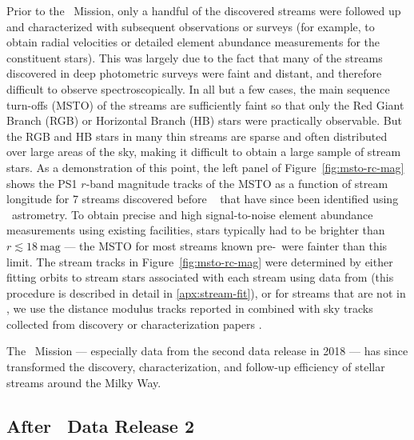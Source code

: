 \documentclass[final,5p,times,twocolumn,authoryear]{elsarticle}
\begin{document}
Prior to the \gaia\ Mission, only a handful of the discovered streams were followed up
and characterized with subsequent observations or surveys (for example, to obtain radial
velocities or detailed element abundance measurements for the constituent stars).
This was largely due to the fact that many of the streams discovered in deep photometric
surveys were faint and distant, and therefore difficult to observe spectroscopically.
In all but a few cases, the main sequence turn-offs (MSTO) of the streams are
sufficiently faint so that only the Red Giant Branch (RGB) or Horizontal Branch (HB)
stars were practically observable.
But the RGB and HB stars in many thin streams are sparse and often distributed over
large areas of the sky, making it difficult to obtain a large sample of stream stars.
As a demonstration of this point, the left panel of Figure~\ref{fig:msto-rc-mag} shows
the PS1 $r$-band magnitude tracks of the MSTO as a function of stream longitude for 7
streams discovered before \gaia\  that have since been identified using \gaia\
astrometry. To obtain precise and high signal-to-noise element abundance measurements
using existing facilities, stars typically had to be brighter than $r \lesssim
18~\textrm{mag}$ --- the MSTO for most streams known pre-\gaia\ were fainter than this
limit.
The stream tracks in Figure~\ref{fig:msto-rc-mag} were determined by either fitting
orbits to stream stars associated with each stream using data from \citet{ibata:2024}
(this procedure is described in detail in \ref{apx:stream-fit}), or for streams that are
not in \citet{ibata:2024}, we use the distance modulus tracks reported in
\citet{li:2022} combined with sky tracks collected from discovery or characterization
papers \citep{shipp:2018, fu:2018, shipp:2019, ferguson:2022, tavangar:2022}.

The \gaia\ Mission --- especially data from the second data release in 2018 --- has
since transformed the discovery, characterization, and follow-up efficiency of stellar
streams around the Milky Way.


\subsection{After \gaia\ Data Release 2}
\end{document}
